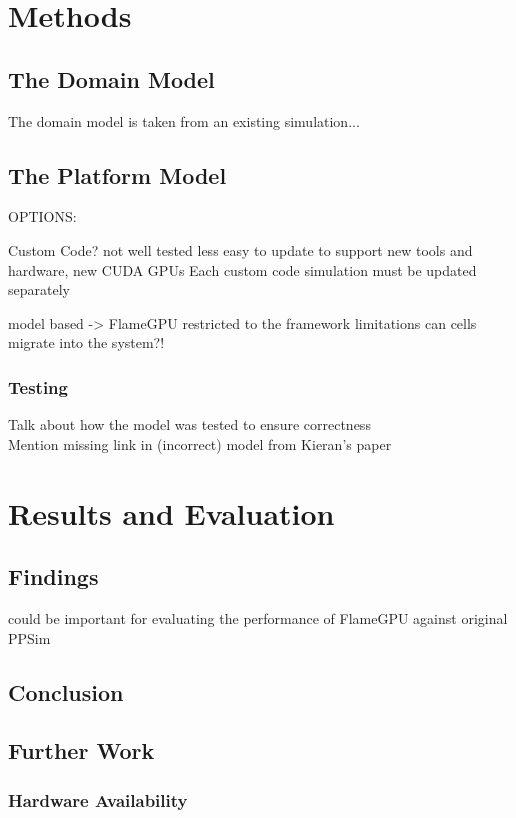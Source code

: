 \documentclass{UoYCSproject}
\begin{document}

\chapter{Methods}
\label{methods}
\section{The Domain Model}
The domain model is taken from an existing simulation...

\section{The Platform Model}
OPTIONS:

Custom Code?\cite{phil_diss}
	not well tested
	less easy to update to support new tools and hardware, new CUDA GPUs
		Each custom code simulation must be updated separately


model based -> FlameGPU\cite{flame_keratinocyte}
	restricted to the framework limitations
		can cells migrate into the system?!

\subsection{Testing}
Talk about how the model was tested to ensure correctness\\
Mention missing link in (incorrect) model from Kieran's paper 

\chapter{Results and Evaluation}
\section{Findings}
\cite{statistical_tests} could be important for evaluating the performance of FlameGPU against original PPSim


\section{Conclusion}

\section{Further Work}
\subsection{Hardware Availability}
\end{document}
